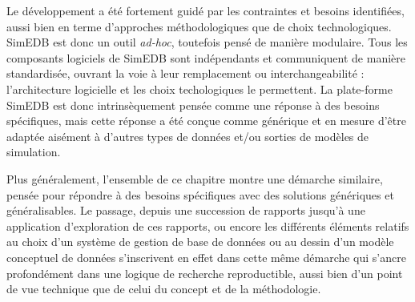 	Le développement a été fortement guidé par les contraintes et besoins identifiées, aussi bien en terme d'approches méthodologiques que de choix technologiques.
	SimEDB est donc un outil \textit{ad-hoc}, toutefois pensé de manière modulaire.
	Tous les composants logiciels de SimEDB sont indépendants et communiquent de manière standardisée, ouvrant la voie à leur remplacement ou \og interchangeabilité\fg{} : l'architecture logicielle et les choix techologiques le permettent.
	La plate-forme SimEDB est donc intrinsèquement pensée comme une réponse à des besoins spécifiques, mais cette réponse a été conçue comme générique et en mesure d'être adaptée aisément à d'autres types de données et/ou sorties de modèles de simulation.
	
	Plus généralement, l'ensemble de ce chapitre montre une démarche similaire, pensée pour répondre à des besoins spécifiques avec des solutions génériques et généralisables.
	Le passage, depuis une succession de rapports jusqu'à une application d'exploration de ces rapports, ou encore les différents éléments relatifs au choix d'un système de gestion de base de données ou au dessin d'un modèle conceptuel de données s'inscrivent en effet dans cette même démarche qui s'ancre profondément dans une logique de recherche reproductible, aussi bien d'un point de vue technique que de celui du concept et de la méthodologie.
	


\printbibliography[title={Références}]
